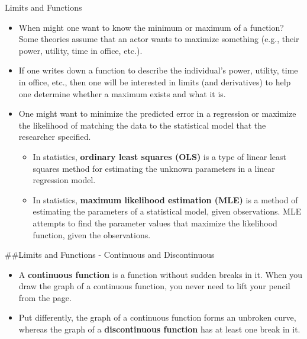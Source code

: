 \documentclass[
  ignorenonframetext,
]{beamer}
\providecommand{\tightlist}{%
  \setlength{\itemsep}{0pt}\setlength{\parskip}{0pt}}
\begin{document}
\begin{frame}{Limits and Functions}
\protect\hypertarget{limits-and-functions-1}{}

\begin{itemize}
\item
  When might one want to know the minimum or maximum of a function? Some
  theories assume that an actor wants to maximize something (e.g., their
  power, utility, time in office, etc.).
\item
  If one writes down a function to describe the individual's power,
  utility, time in office, etc., then one will be interested in limits
  (and derivatives) to help one determine whether a maximum exists and
  what it is.
\item
  One might want to minimize the predicted error in a regression or
  maximize the likelihood of matching the data to the statistical model
  that the researcher specified.

  \begin{itemize}
  \item
    In statistics, \textbf{ordinary least squares (OLS)} is a type of
    linear least squares method for estimating the unknown parameters in
    a linear regression model.
  \item
    In statistics, \textbf{maximum likelihood estimation (MLE)} is a
    method of estimating the parameters of a statistical model, given
    observations. MLE attempts to find the parameter values that
    maximize the likelihood function, given the observations.
  \end{itemize}
\end{itemize}

\#\#Limits and Functions - Continuous and Discontinuous

\begin{itemize}
\tightlist
\item
  A \textbf{continuous function} is a function without sudden breaks in
  it. When you draw the graph of a continuous function, you never need
  to lift your pencil from the page.
\item
  Put differently, the graph of a continuous function forms an unbroken
  curve, whereas the graph of a \textbf{discontinuous function} has at
  least one break in it.
\end{itemize}

\end{frame}
\end{document}
